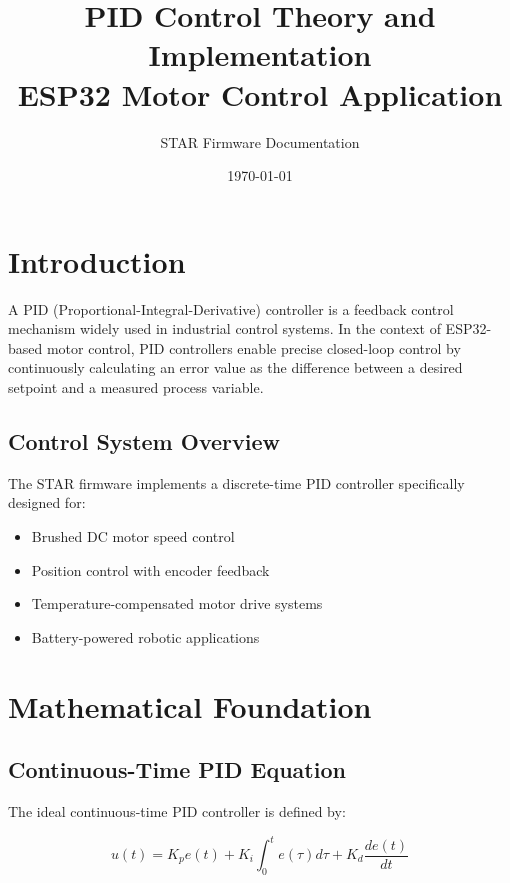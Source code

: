 \documentclass[11pt,a4paper]{article}
\title{\textbf{PID Control Theory and Implementation}\\
\large ESP32 Motor Control Application}
\author{STAR Firmware Documentation}
\date{\today}
\begin{document}
\maketitle
\tableofcontents
\newpage

\section{Introduction}

A PID (Proportional-Integral-Derivative) controller is a feedback control mechanism widely used in industrial control systems. In the context of ESP32-based motor control, PID controllers enable precise closed-loop control by continuously calculating an error value as the difference between a desired setpoint and a measured process variable.

\subsection{Control System Overview}

The STAR firmware implements a discrete-time PID controller specifically designed for:
\begin{itemize}
  \item Brushed DC motor speed control
  \item Position control with encoder feedback
  \item Temperature-compensated motor drive systems
  \item Battery-powered robotic applications
\end{itemize}

\section{Mathematical Foundation}

\subsection{Continuous-Time PID Equation}

The ideal continuous-time PID controller is defined by:

\begin{tcolorbox}[colback=blue!5!white,colframe=blue!75!black,title=Continuous PID Equation]
\begin{equation}
u(t) = K_p e(t) + K_i \int_0^t e(\tau) d\tau + K_d \frac{de(t)}{dt}
\end{equation}
\end{tcolorbox}
\end{document}
